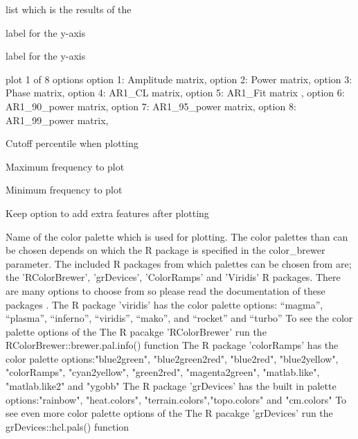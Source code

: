\documentclass[a4paper]{book}
\begin{document}
\begin{Arguments}
\begin{ldescription}
\item[\code{win\_fft}] list which is the results of the 

\item[\code{x\_lab}] label for the y-axis 

\item[\code{y\_lab}] label for the y-axis 

\item[\code{plot\_res}] plot 1 of 8 options option 1: Amplitude matrix,
option 2: Power matrix,
option 3: Phase matrix,
option 4: AR1\_CL matrix,
option 5: AR1\_Fit matrix ,
option 6: AR1\_90\_power matrix,
option 7: AR1\_95\_power matrix,
option 8: AR1\_99\_power matrix, 

\item[\code{perc\_vis}] Cutoff percentile when plotting 

\item[\code{freq\_max}] Maximum frequency to plot

\item[\code{freq\_min}] Minimum frequency to plot

\item[\code{keep\_editable}] Keep option to add extra features after plotting  

\item[\code{palette\_name}] Name of the color palette which is used for plotting.
The color palettes than can be chosen depends on which the R package is specified in
the color\_brewer parameter. The included R packages from which palettes can be chosen
from are; the 'RColorBrewer', 'grDevices', 'ColorRamps' and 'Viridis' R packages.
There are many options to choose from so please
read the documentation of these packages .
The R package 'viridis' has the color palette options: “magma”, “plasma”,
“inferno”, “viridis”, “mako”, and “rocket”  and “turbo”
To see the color palette options of the The R pacakge 'RColorBrewer' run
the RColorBrewer::brewer.pal.info() function
The R package 'colorRamps' has the color palette options:"blue2green",
"blue2green2red", "blue2red",    "blue2yellow", "colorRamps",    "cyan2yellow",
"green2red", "magenta2green", "matlab.like", "matlab.like2" and    "ygobb"
The R package 'grDevices' has the built in  palette options:"rainbow",
"heat.colors", "terrain.colors","topo.colors" and "cm.colors"
To see even more color palette options of the The R pacakge 'grDevices' run
the grDevices::hcl.pals() function


\end{ldescription}
\end{Arguments}
\end{document}
